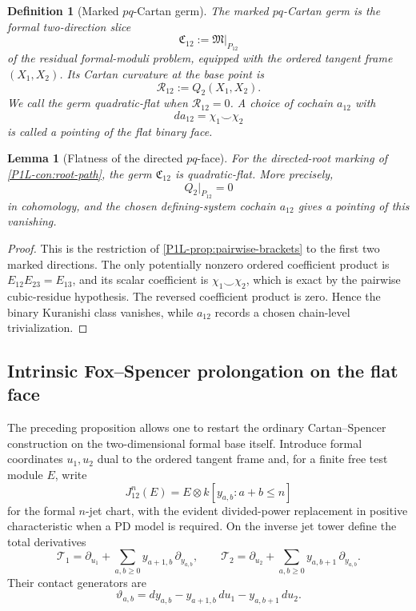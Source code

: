 \documentclass[11pt]{article}
\newtheorem{lemma}[theorem]{Lemma}
\newtheorem{definition}[theorem]{Definition}
\theoremstyle{remark}
\begin{document}
\begin{definition}[Marked \(pq\)-Cartan germ]\label{P1L-def:pq-cartan-germ}
The marked \(pq\)-Cartan germ is the formal two-direction slice
\[
 \mathfrak C_{12}
 :=\mathfrak M\big|_{P_{12}}
\]
of the residual formal-moduli problem, equipped with the ordered tangent frame
\((X_1,X_2)\).  Its Cartan curvature at the base point is
\[
 \mathcal R_{12}:=Q_2(X_1,X_2).
\]
We call the germ \emph{quadratic-flat} when \(\mathcal R_{12}=0\).
A choice of cochain \(a_{12}\) with
\[
 da_{12}=\chi_1\smile\chi_2
\]
is called a pointing of the flat binary face.
\end{definition}

\begin{lemma}[Flatness of the directed \(pq\)-face]
\label{P1L-prop:pq-cartan-flat}
For the directed-root marking of \cref{P1L-con:root-path}, the germ
\(\mathfrak C_{12}\) is quadratic-flat.  More precisely,
\[
 Q_2|_{P_{12}}=0
\]
in cohomology, and the chosen defining-system cochain \(a_{12}\) gives a
pointing of this vanishing.
\end{lemma}

\begin{proof}
This is the restriction of \cref{P1L-prop:pairwise-brackets} to the first two
marked directions.  The only potentially nonzero ordered coefficient product
is \(E_{12}E_{23}=E_{13}\), and its scalar coefficient is
\(\chi_1\smile\chi_2\), which is exact by the pairwise cubic-residue
hypothesis.  The reversed coefficient product is zero.  Hence the binary
Kuranishi class vanishes, while \(a_{12}\) records a chosen chain-level
trivialization.
\end{proof}

\subsection{Intrinsic Fox--Spencer prolongation on the flat face}

The preceding proposition allows one to restart the ordinary Cartan--Spencer
construction on the two-dimensional formal base itself.  Introduce formal
coordinates \(u_1,u_2\) dual to the ordered tangent frame and, for a finite
free test module \(E\), write
\[
 J^n_{12}(E)
 =E\otimes
 k[y_{a,b}:a+b\le n]
\]
for the formal \(n\)-jet chart, with the evident divided-power replacement in
positive characteristic when a PD model is required.  On the inverse jet
tower define the total derivatives
\[
 \mathcal T_1
 =\partial_{u_1}
  +\sum_{a,b\ge0}y_{a+1,b}\,\partial_{y_{a,b}},
 \qquad
 \mathcal T_2
 =\partial_{u_2}
  +\sum_{a,b\ge0}y_{a,b+1}\,\partial_{y_{a,b}}.
\]
Their contact generators are
\[
 \vartheta_{a,b}
 =dy_{a,b}-y_{a+1,b}\,du_1-y_{a,b+1}\,du_2.
\]
\end{document}
